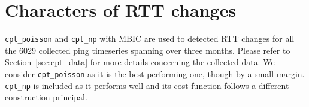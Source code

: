 \section{Characters of RTT changes}
\label{sec:cpt_trace}
\texttt{cpt\_poisson} and \texttt{cpt\_np} with MBIC are used to detected RTT changes for all the 6029 collected ping timeseries spanning over three months.
Please refer to Section~\ref{sec:cpt_data} for more details concerning the collected data.
We consider \texttt{cpt\_poisson} as it is the best performing one, though by a small margin.
\texttt{cpt\_np} is included as it performs well and its cost function follows a different construction principal.


